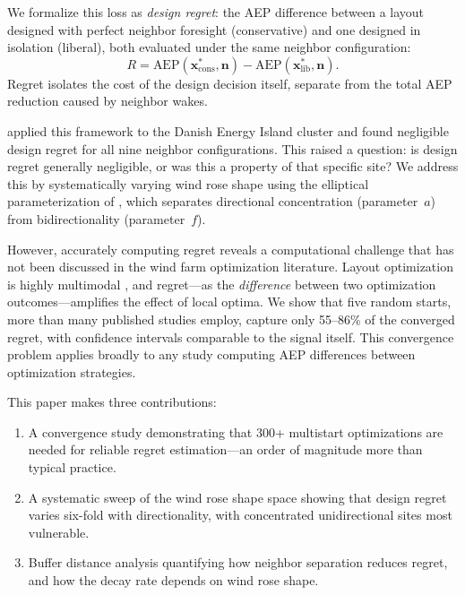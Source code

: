 \documentclass[manuscript, 12pt]{copernicus}
\begin{document}
We formalize this loss as \emph{design regret}: the AEP difference between a layout designed with perfect neighbor foresight (conservative) and one designed in isolation (liberal), both evaluated under the same neighbor configuration:
\begin{equation}\label{eq:regret}
    R = \text{AEP}(\mathbf{x}^*_\text{cons}, \mathbf{n}) - \text{AEP}(\mathbf{x}^*_\text{lib}, \mathbf{n}).
\end{equation}
Regret isolates the cost of the design decision itself, separate from the total AEP reduction caused by neighbor wakes.

\citet{Quick2026omae} applied this framework to the Danish Energy Island cluster and found negligible design regret for all nine neighbor configurations.
This raised a question: is design regret generally negligible, or was this a property of that specific site?
We address this by systematically varying wind rose shape using the elliptical parameterization of \citet{Hart2025}, which separates directional concentration (parameter~$a$) from bidirectionality (parameter~$f$).

However, accurately computing regret reveals a computational challenge that has not been discussed in the wind farm optimization literature.
Layout optimization is highly multimodal \citep{Thomas2023, ValottaRodrigues2024}, and regret---as the \emph{difference} between two optimization outcomes---amplifies the effect of local optima.
We show that five random starts, more than many published studies employ, capture only 55--86\% of the converged regret, with confidence intervals comparable to the signal itself.
This convergence problem applies broadly to any study computing AEP differences between optimization strategies.

This paper makes three contributions:
\begin{enumerate}
    \item A convergence study demonstrating that 300+ multistart optimizations are needed for reliable regret estimation---an order of magnitude more than typical practice.
    \item A systematic sweep of the wind rose shape space showing that design regret varies six-fold with directionality, with concentrated unidirectional sites most vulnerable.
    \item Buffer distance analysis quantifying how neighbor separation reduces regret, and how the decay rate depends on wind rose shape.
\end{enumerate}
\end{document}
